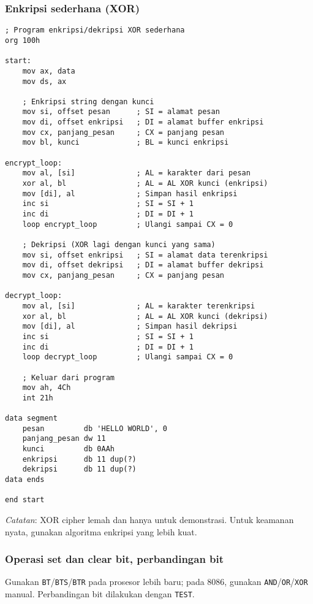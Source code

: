 \documentclass[../main.tex]{subfiles}
\begin{document}
\subsubsection{Enkripsi sederhana (XOR)}
\begin{lstlisting}[language={[x86masm]Assembler}, caption=Enkripsi XOR Sederhana, label={lst:xor-encryption}]
; Program enkripsi/dekripsi XOR sederhana
org 100h

start:
    mov ax, data
    mov ds, ax
    
    ; Enkripsi string dengan kunci
    mov si, offset pesan      ; SI = alamat pesan
    mov di, offset enkripsi   ; DI = alamat buffer enkripsi
    mov cx, panjang_pesan     ; CX = panjang pesan
    mov bl, kunci             ; BL = kunci enkripsi
    
encrypt_loop:
    mov al, [si]              ; AL = karakter dari pesan
    xor al, bl                ; AL = AL XOR kunci (enkripsi)
    mov [di], al              ; Simpan hasil enkripsi
    inc si                    ; SI = SI + 1
    inc di                    ; DI = DI + 1
    loop encrypt_loop         ; Ulangi sampai CX = 0
    
    ; Dekripsi (XOR lagi dengan kunci yang sama)
    mov si, offset enkripsi   ; SI = alamat data terenkripsi
    mov di, offset dekripsi   ; DI = alamat buffer dekripsi
    mov cx, panjang_pesan     ; CX = panjang pesan
    
decrypt_loop:
    mov al, [si]              ; AL = karakter terenkripsi
    xor al, bl                ; AL = AL XOR kunci (dekripsi)
    mov [di], al              ; Simpan hasil dekripsi
    inc si                    ; SI = SI + 1
    inc di                    ; DI = DI + 1
    loop decrypt_loop         ; Ulangi sampai CX = 0
    
    ; Keluar dari program
    mov ah, 4Ch
    int 21h

data segment
    pesan         db 'HELLO WORLD', 0
    panjang_pesan dw 11
    kunci         db 0AAh
    enkripsi      db 11 dup(?)
    dekripsi      db 11 dup(?)
data ends

end start
\end{lstlisting}

\textit{Catatan}: XOR cipher lemah dan hanya untuk demonstrasi. Untuk keamanan nyata, gunakan algoritma enkripsi yang lebih kuat.

\subsubsection{Operasi set dan clear bit, perbandingan bit}
Gunakan \texttt{BT}/\texttt{BTS}/\texttt{BTR} pada prosesor lebih baru; pada 8086, gunakan \texttt{AND}/\texttt{OR}/\texttt{XOR} manual. Perbandingan bit dilakukan dengan \texttt{TEST}.
\end{document}
